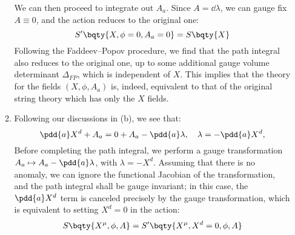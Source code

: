 \documentclass[a4paper,10pt]{article}
\begin{document}
\begin{enumerate}
\begin{enumerate}
	
	We can then proceed to integrate out $A_a$. Since $A = \dd{\lambda}$, we can gauge fix $A \equiv 0$, and the action reduces to the original one:
	\begin{equation}
		S'\bqty{X,\phi=0,A_a=0}
		= S\bqty{X}
	\end{equation}
	Following the Faddeev--Popov procedure, we find that the path integral also reduces to the original one, up to some additional gauge volume determinant $\Delta_{FP}$, which is independent of $X$. This implies that the theory for the fields $(X,\phi,A_a)$ is, indeed, equivalent to that of the original string theory which has only the $X$ fields.
	
	\item Following our discussions in (b), we see that:
	\begin{equation}
		\pdd{a} X^d + A_a
		= 0 + A_a - \pdd{a} \lambda,\quad
		\lambda = -\pdd{a} X^d,
	\end{equation}
	Before completing the path integral, we perform a gauge transformation $
		A_a \mapsto A_a - \pdd{a} \lambda
	$, with $\lambda =  -X^d$. Assuming that there is no anomaly, we can ignore the functional Jacobian of the transformation, and the path integral shall be gauge invariant; in this case, the $\pdd{a} X^d$ term is canceled precisely by the gauge transformation, which is equivalent to setting $X^d = 0$ in the action:
	\begin{equation}
		S\bqty{
				X^\mu,\phi,A
			}
		= S'\bqty{
				X^\mu,X^d = 0,\phi,A
			}
	\end{equation}
	

\end{enumerate}
\end{enumerate}
\end{document}
